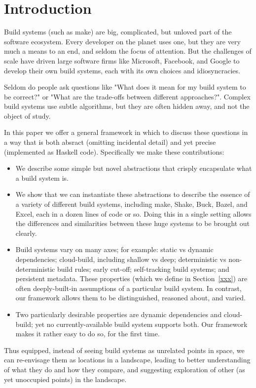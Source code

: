 \section{Introduction}\label{sec-intro}

Build systems (such as make) are big, complicated, but unloved part of
the software ecosystem.  Every developer on the planet uses one, but
they are very much a means to an end, and seldom the focus of
attention.  But the challenges of scale have driven large software firms
like Microsoft, Facebook, and Google to develop their own build
systems, each with its own choices and idiosyncracies.

Seldom do people ask questions like "What does it mean for my build
system to be correct?" or "What are the trade-offs between different
approaches?".  Complex build systems use subtle algorithms, but they
are often hidden away, and not the object of study.

In this paper we offer a general framework in which to discuss these
questions in a way that is both absract (omitting incidental detail)
and yet precise (implemented as Haskell code).  Specifically we make
these contributions:
\begin{itemize}
\item We describe some simple but novel abstractions that
crisply encapsulate what a build system is.
\item We show that we can instantiate
these abstractions to describe the essence of a variety of different
build systems, including make, Shake, Buck, Bazel, and Excel, each in
a dozen lines of code or so.
Doing this in a single setting allows
the differences and similarities between these huge systems to be
brought out clearly.
\item Build systems vary on many axes;
for example: static vs dynamic dependencies; cloud-build, including
shallow vs deep; deterministic vs non-deterministic build rules;
early cut-off; self-tracking build systems; and persistent metadata.
These properties (which we define in Section~\ref{xxx}) are often
deeply-built-in assumptions of a particular build system.
In contrast, our framework allows them to be distinguished,
reasoned about, and varied.
\item Two particularly desirable properties are dynamic dependencies
and cloud-build; yet no currently-available build system supports
both.  Our framework makes it rather easy to do so, for the first
time.
\end{itemize}
Thus equipped, instead of seeing build systems as unrelated
points in space, we can re-envisage them as locations in a landscape,
leading to better understanding of what they do and how they compare,
and suggesting exploration of other (as yet unoccupied points) in the
landscape.

